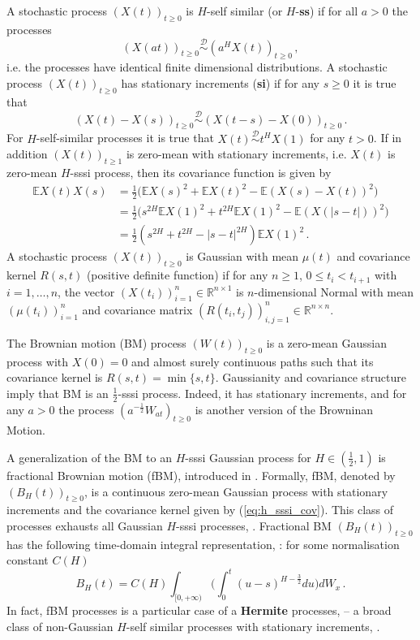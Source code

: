 \documentclass[a4paper]{article}
\newcommand{\Real}{\mathbb{R}}
\newcommand{\ex}{\mathbb{E}}
\newcommand{\Dcal}{\mathcal{D}}
\begin{document}
A stochastic process $(X(t))_{t\geq0}$ is $H$-self similar (or $H$-\textbf{ss}) if
for all $a>0$ the processes 
\begin{equation*}\label{eq:def_ss}
    (X(at))_{t\geq0} \overset{\Dcal}{\sim} (a^H X(t))_{t\geq0} \,,
\end{equation*}
i.e. the processes have identical finite dimensional distributions. A stochastic
process $(X(t))_{t\geq0}$ has stationary increments (\textbf{si}) if for any $s\geq 0$
it is true that
\begin{equation*}\label{eq:def_si}
    (X(t)-X(s))_{t\geq0} \overset{\Dcal}{\sim} (X(t-s)-X(0))_{t\geq0} \,.
\end{equation*}
For $H$-self-similar processes it is true that $X(t) \overset{\Dcal}{\sim} t^H X(1)$
for any $t>0$. If in addition $(X(t))_{t\geq1}$ is zero-mean with stationary increments,
i.e. $X(t)$ is zero-mean $H$-sssi process, then its covariance function is given by
\begin{align*}\label{eq:h_sssi_cov}
    \ex X(t) X(s)
        &= \frac{1}{2} \bigl(\ex X(s)^2 + \ex X(t)^2 - \ex(X(s) - X(t))^2 \bigr)\\
        &= \frac{1}{2} \bigl( s^{2H} \ex X(1)^2 + t^{2H}\ex X(1)^2 - \ex(X(|s-t|))^2 \bigr)\\
        &= \frac{1}{2} (s^{2H}  + t^{2H} - |s-t|^{2H}) \ex X(1)^2 \,.
\end{align*}
A stochastic process $(X(t))_{t\geq0}$ is Gaussian with mean $\mu(t)$ and covariance
kernel $R(s,t)$ (positive definite function) if for any $n\geq 1$, $0 \leq t_i < t_{i+1}$
with $i=1,\ldots,n$, the vector $(X(t_i))_{i=1}^n\in \Real^{n\times1}$ is $n$-dimensional
Normal with mean $(\mu(t_i))_{i=1}^n$ and covariance matrix $(R(t_i, t_j))_{i,j=1}^n\in \Real^{n\times n}$.

The Brownian motion (BM) process $(W(t))_{t\geq0}$ is a zero-mean Gaussian process
with $X(0)=0$ and almost surely continuous paths such that its covariance kernel
is $R(s,t)=\min\{s, t\}$. Gaussianity and covariance structure imply that BM is an
$\frac{1}{2}$-sssi process. Indeed, it has stationary increments, and for any $a>0$
the process $(a^{-\frac{1}{2}} W_{at})_{t\geq0}$ is another version of the Browninan
Motion.

A generalization of the BM to an $H$-sssi Gaussian process for $H \in (\frac{1}{2}, 1)$
is fractional Brownian motion (fBM), introduced in \cite{doi:10.1137/1010093}. Formally,
fBM, denoted by $(B_H(t))_{t\geq0}$, is a continuous zero-mean Gaussian process with
stationary increments and the covariance kernel given by (\ref{eq:h_sssi_cov}). This
class of processes exhausts all Gaussian $H$-sssi processes, \cite{embrechtsselfsimilar}.
Fractional BM $(B_H(t))_{t\geq0}$ has the following time-domain integral representation,
\cite{embrechtsselfsimilar}: for some normalisation constant $C(H)$
\begin{equation}\label{eq:fbm_int_repr}
    B_H(t) = C(H) \int_{[0,+\infty)} \biggl(
            \int_0^t (u-s)^{H-\frac{3}{2}} du
        \biggr) dW_x \,.
\end{equation}
In fact, fBM processes is a particular case of a \textbf{Hermite} processes, -- a broad
class of non-Gaussian $H$-self similar processes with stationary increments, \cite{maejima2007}.
\end{document}
